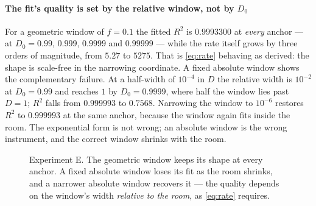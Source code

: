 \documentclass[conference]{IEEEtran}
\theoremstyle{definition}
\begin{document}
\paragraph{The fit's quality is set by the relative window, not by $D_0$} For a
geometric window of $f=0.1$ the fitted $R^{2}$ is
$0.9993300$ at \emph{every} anchor --- at $D_0=0.99$, $0.999$, $0.9999$ and
$0.99999$ --- while the rate itself grows by three orders of magnitude, from
$5.27$ to $5275$. That is \eqref{eq:rate} behaving as derived: the shape is
scale-free in the narrowing coordinate. A fixed absolute window shows the
complementary failure. At a half-width of $10^{-4}$ in $D$ the relative width is
$10^{-2}$ at $D_0=0.99$ and reaches $1$ by $D_0=0.9999$, where half the window lies
past $D=1$; $R^{2}$ falls from $0.999993$ to $0.7568$. Narrowing the window to
$10^{-6}$ restores $R^{2}$ to $0.999993$ at the same anchor, because the window
again fits inside the room. The exponential form is not wrong; an absolute window
is the wrong instrument, and the correct window shrinks with the room.

\begin{figure}[t]
\centering
{}
\caption{Experiment E. The geometric window keeps its shape at every anchor. A
fixed absolute window loses its fit as the room shrinks, and a narrower absolute
window recovers it --- the quality depends on the window's width \emph{relative to
the room}, as \eqref{eq:rate} requires.}
\label{fig:windows}
\end{figure}
\end{document}
